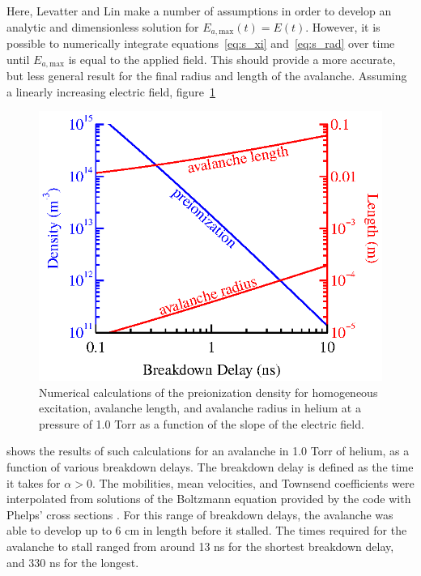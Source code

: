 Here, Levatter and Lin make a number of assumptions in order to develop an
analytic and dimensionless solution for $E_{a,\mathrm{max}}(t) = E(t)$. However,
it is possible to numerically integrate equations~\ref{eq:s_xi}
and~\ref{eq:s_rad} over time until $E_{a,\mathrm{max}}$ is equal to the applied
field. This should provide a more accurate, but less general result for the
final radius and length of the avalanche. Assuming a linearly increasing
electric field, figure~\ref{fig:he_avalanche}
\begin{figure}
  \centering
  \includegraphics{./chapters/theory/figures/he_avalanche.eps}
  \caption{Numerical calculations of the preionization density for homogeneous
    excitation, avalanche length, and avalanche radius in helium at a pressure
    of 1.0 Torr as a function of the slope of the electric field.}
  \label{fig:he_avalanche}
\end{figure}
shows the results of such calculations for an avalanche in 1.0 Torr of helium,
as a function of various breakdown delays. The breakdown delay is defined as the
time it takes for $\alpha > 0$. The mobilities, mean velocities, and Townsend
coefficients were interpolated from solutions of the Boltzmann equation provided
by the  code with Phelps' cross sections \cite{Phelps2002}. For
this range of breakdown delays, the avalanche was able to develop up to 6 cm in
length before it stalled. The times required for the avalanche to stall ranged
from around 13 ns for the shortest breakdown delay, and 330 ns for the longest.


